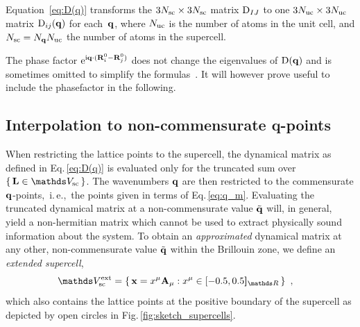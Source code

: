 Equation~\eqref{eq:D(q)} transforms the $3N_{\rm sc} \times 3N_{\rm sc}$ matrix ${\rm D}_{IJ}$ to one $3N_{\rm uc} \times 3N_{\rm uc}$ matrix ${\rm D}_{ij} (\bf q)$ for each~${\bf q}$, where $N_{\rm uc}$ is the number of atoms in the unit cell, and $N_{\rm sc} = N_{\bf q} N_{\rm uc}$ the number of atoms in the supercell. 

The phase factor ${\rm e}^{{\rm i} {\bf q} \cdot ({\bf R}_i^0 - {\bf R}_j^0)}$ does not change the eigenvalues of ${\rm D} ({\bf q})$ and is sometimes omitted to simplify the formulas~\cite{BornHuang}. It will however prove useful to include the phasefactor in the following.

\subsection{Interpolation to non-commensurate q-points}
When restricting the lattice points to the supercell, the dynamical matrix as defined in Eq.\,\eqref{eq:D(q)} is evaluated only for the truncated sum over $\set{\b L \in \mathds V_{\rm sc}}$. The wavenumbers ${\bf q}$ are then restricted to the commensurate ${\bf q}$-points,~i.\,e.,~the points given in terms of Eq.\,\eqref{eq:q_m}. Evaluating the truncated dynamical matrix at a non-commensurate value $\tilde{{\bf q}}$ will, in general, yield a non-hermitian matrix which cannot be used to extract physically sound information about the system. To obtain an \emph{approximated} dynamical matrix at any other, non-commensurate value $\tilde{{\bf q}}$ within the Brillouin zone, we define an \emph{extended supercell}, 
\begin{align}
	\mathds V_{\rm sc}^{\rm ext}
		&= \set{{\bf x} = x^\mu {\bf A}_\mu : x^\mu \in {[-0.5, 0.5 \boldsymbol{]}_{\mathds R}}}~,
	\label{eq:supercell.extended}
\end{align}
which also contains the lattice points at the positive boundary of the supercell as depicted by open circles in Fig.\,\ref{fig:sketch_supercells}.
